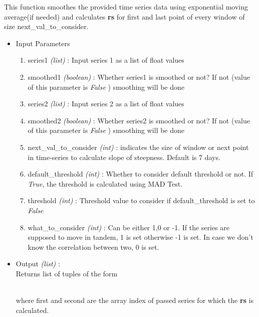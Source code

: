 This function smoothes the provided time series data using exponential moving average(if needed) and 
calculates \textbf{rs} for first and last point of every window of size next{\_}val{\_}to{\_}consider.


\begin{itemize}
 \item Input Parameters
 
 \begin{enumerate}
  \item series1 \textit{(list)} : Input series 1 as a list of float values
  \item smoothed1 \textit{(boolean)} : Whether series1 is smoothed or not? If not (value of this parameter is \textit{False} ) smoothing will be done
  \item series2 \textit{(list)} : Input series 2 as a list of float values
  \item smoothed2 \textit{(boolean)} : Whether series2 is smoothed or not? If not (value of this parameter is \textit{False} ) smoothing will be done
  \item next{\_}val{\_}to{\_}consider \textit{(int)} : indicates the size of window or next point in time-series to calculate slope of steepness. Default is 7 days.
  \item default{\_}threshold \textit{(int)} : Whether to consider default threshold or not. If \textit{True}, the threshold is calculated using MAD Test.
  \item threshold \textit{(int)} : Threshold value to consider if default\_threshold is set to \textit{False}
  \item what{\_}to{\_}consider \textit{(int)} : Can be either 1,0 or -1. If the series are supposed to move in tandem, 1 is set otherwise -1 is set. In case we don't know the correlation between two, 0 is set.
  \end{enumerate}

 \item Output \textit{(list)} : \\
  Returns list of tuples of the form \\
  \\
  \begin{flushleft}
 where first and second are the array index of passed series for which the \textbf{rs} is calculated.
 \end{flushleft}
\end{itemize}

